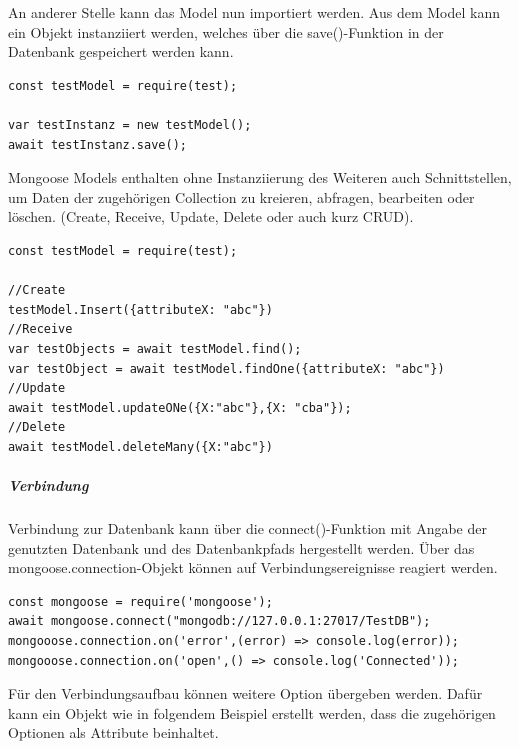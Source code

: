 \noindent
An anderer Stelle kann das Model nun importiert werden. Aus dem Model kann ein Objekt instanziiert werden, welches über die save()-Funktion in der Datenbank gespeichert werden kann.

\begin{lstlisting}[caption=Model importieren - Objekt instanziieren und persistent speichern,label=lst:MongooseObjectInstance]
const testModel = require(test);

var testInstanz = new testModel();
await testInstanz.save();
\end{lstlisting}

\noindent
Mongoose Models enthalten ohne Instanziierung des Weiteren auch Schnittstellen, um Daten der zugehörigen Collection zu kreieren, abfragen, bearbeiten oder löschen. (Create, Receive, Update, Delete oder auch kurz CRUD).
\newline


\begin{lstlisting}[caption=CRUD-Beispielfunktionen eines Mongoose-Models,label=lst:MongooseCrud]
const testModel = require(test);

//Create
testModel.Insert({attributeX: "abc"})
//Receive
var testObjects = await testModel.find();
var testObject = await testModel.findOne({attributeX: "abc"})
//Update
await testModel.updateONe({X:"abc"},{X: "cba"});
//Delete
await testModel.deleteMany({X:"abc"})
\end{lstlisting}

\newpage
\noindent
\subparagraph{Verbindung}
Verbindung zur Datenbank kann über die connect()-Funktion mit Angabe der genutzten Datenbank und des Datenbankpfads hergestellt werden. 
Über das mongoose.connection-Objekt können auf Verbindungsereignisse reagiert werden. 
\newline

\begin{lstlisting}[caption=Mongoose: Verbindung zur Datenbank aufbauen,
label=lst:MongooseConnect]
const mongoose = require('mongoose');
await mongoose.connect("mongodb://127.0.0.1:27017/TestDB");
mongooose.connection.on('error',(error) => console.log(error));
mongooose.connection.on('open',() => console.log('Connected'));
\end{lstlisting}

\noindent
Für den Verbindungsaufbau können weitere Option übergeben werden. Dafür kann ein Objekt wie in folgendem Beispiel erstellt werden, dass die zugehörigen Optionen als Attribute beinhaltet. 
\newline

